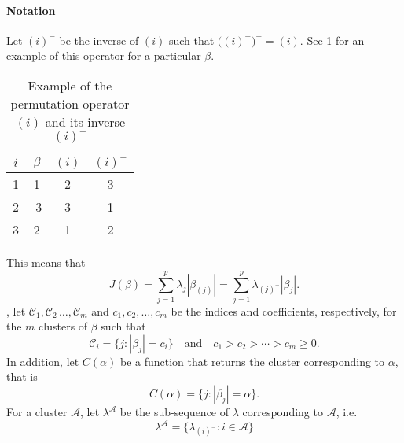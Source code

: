 \paragraph{Notation}\label{sec:notation}

Let \((i)^{-}\) be the inverse of \((i)\) such that
\(\big((i)^-\big)^- = (i)\). See \cref{tab:permutation-example} for an
example of this operator for a particular \(\beta\).
\begin{table}
  \centering
  \caption{Example of the permutation operator \((i)\) and its inverse
    \((i)^-\)\label{tab:permutation-example} }
  \begin{tabular}{cccc}
    \toprule
    \(i\) & \(\beta\) & \((i)\) & \((i)^-\) \\
    \midrule
    1     & 1         & 2              & 3                \\
    2     & -3        & 3              & 1                \\
    3     & 2         & 1              & 2                \\
    \bottomrule
  \end{tabular}
\end{table}
This means that
\[
  J(\beta) = \sum_{j=1}^p \lambda_j |\beta_{(j)}|
  = \sum_{j=1}^p \lambda_{(j)^-}|\beta_j|.
\]
, let \(\mathcal{C}_1, \mathcal{C}_2\, \dots, \mathcal{C}_m\) and \(c_1,
c_2, \dots, c_m\) be the indices and coefficients, respectively, for the \(m\)
clusters of $\beta$ such that
\[
  \mathcal{C}_i = \{j : |\beta_j| = c_i\} \quad \text{and} \quad
  c_1 > c_2 > \cdots > c_m \geq 0.
\]
In addition, let \(C(\alpha)\) be a function that returns the
cluster corresponding to \(\alpha\), that is
\[
  C(\alpha) = \{j : |\beta_j| = \alpha\}.
\]
For a cluster $\mathcal{A}$, let \(\lambda^{\mathcal{A}}\) be the sub-sequence of
\(\lambda\) corresponding to \(\mathcal{A}\), i.e.
\[
  \lambda^\mathcal{A} = \{\lambda_{(i)^-} : i \in \mathcal{A}\}
\]




